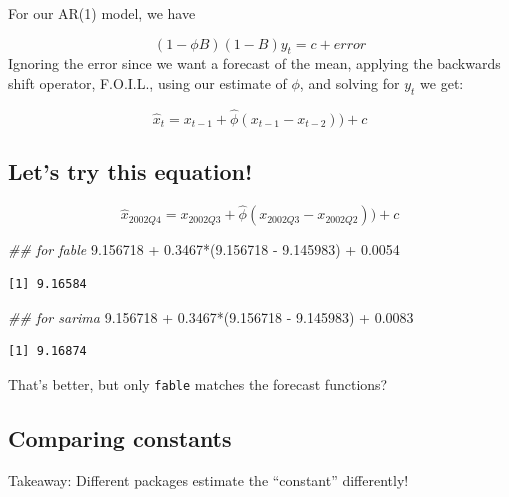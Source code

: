 \documentclass[
  letterpaper,
  DIV=11,
  numbers=noendperiod]{scrartcl}
\newenvironment{Shaded}{\begin{snugshade}}{\end{snugshade}}
\newcommand{\DocumentationTok}[1]{\textcolor[rgb]{0.37,0.37,0.37}{\textit{#1}}}
\newcommand{\FloatTok}[1]{\textcolor[rgb]{0.68,0.00,0.00}{#1}}
\newcommand{\NormalTok}[1]{\textcolor[rgb]{0.00,0.23,0.31}{#1}}
\newcommand{\SpecialCharTok}[1]{\textcolor[rgb]{0.37,0.37,0.37}{#1}}
\begin{document}
For our AR(1) model, we have

\[
(1 - \phi B)(1-B)y_t = c + error
\] Ignoring the error since we want a forecast of the mean, applying the
backwards shift operator, F.O.I.L., using our estimate of \(\phi\), and
solving for \(y_t\) we get:

\[
\hat{x}_t = x_{t-1} + \hat{\phi}(x_{t-1} - x_{t-2}))+ c
\]

\subsection{Let's try this equation!}\label{lets-try-this-equation}

\[
\hat{x}_{2002 Q4} = x_{2002 Q3} + \hat{\phi}(x_{2002 Q3} - x_{2002 Q2}))+ c
\]

\begin{Shaded}
\begin{Highlighting}[]
\DocumentationTok{\#\# for fable}
\FloatTok{9.156718} \SpecialCharTok{+} \FloatTok{0.3467}\SpecialCharTok{*}\NormalTok{(}\FloatTok{9.156718} \SpecialCharTok{{-}} \FloatTok{9.145983}\NormalTok{) }\SpecialCharTok{+} \FloatTok{0.0054}
\end{Highlighting}
\end{Shaded}

\begin{verbatim}
[1] 9.16584
\end{verbatim}

\begin{Shaded}
\begin{Highlighting}[]
\DocumentationTok{\#\# for sarima}
\FloatTok{9.156718} \SpecialCharTok{+} \FloatTok{0.3467}\SpecialCharTok{*}\NormalTok{(}\FloatTok{9.156718} \SpecialCharTok{{-}} \FloatTok{9.145983}\NormalTok{) }\SpecialCharTok{+} \FloatTok{0.0083}
\end{Highlighting}
\end{Shaded}

\begin{verbatim}
[1] 9.16874
\end{verbatim}

That's better, but only \texttt{fable} matches the forecast functions?

\subsection{Comparing constants}\label{comparing-constants}

Takeaway: Different packages estimate the ``constant'' differently!
\end{document}
